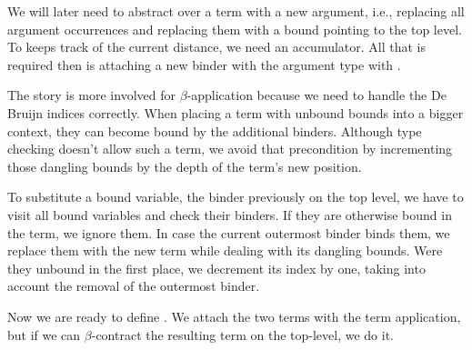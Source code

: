 
We will later need to abstract over a term with a new argument, i.e., replacing all argument occurrences and replacing them with a bound pointing to the top level.
To keeps track of the current distance, we need an accumulator.
All that is required then is attaching a new binder with the argument type with .


The story is more involved for \(\beta\)-application \isa{(\isasymbullet)} because we need to handle the De Bruijn indices correctly.
When placing a term with unbound bounds into a bigger context, they can become bound by the additional binders.
Although type checking doesn't allow such a term, we avoid that precondition by incrementing those dangling bounds by the depth of the term's new position.


To substitute a bound variable, the binder previously on the top level, we have to visit all bound variables and check their binders.
If they are otherwise bound in the term, we ignore them.
In case the current outermost binder binds them, we replace them with the new term while dealing with its dangling bounds.
Were they unbound in the first place, we decrement its index by one, taking into account the removal of the outermost binder.


Now we are ready to define \isa{(\isasymbullet)}.
We attach the two terms with the term application, but if we can \(\beta\)-contract the resulting term on the top-level, we do it.

